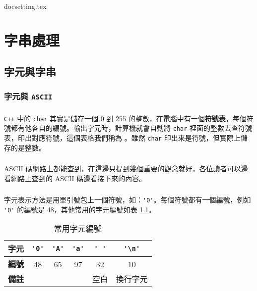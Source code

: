 \documentclass[12pt,a4paper,oneside]{report}
\begin{document}
\begin{CJK}{UTF8}{bkai}

{docsetting.tex}
\setcounter{chapter}{2}

\fi

\chapter{字串處理}

\section{字元與字串}

\subsection{字元與 \texttt{ASCII}}

\paragraph{}\texttt{C++} 中的 \lstinline!char! 其實是儲存一個 0 到 255 的整數，在電腦中有一個\textbf{符號表}，每個符號都有他各自的編號。輸出字元時，計算機就會自動將 \lstinline!char! 裡面的整數去查符號表，印出對應符號，這個表格我們稱為 。雖然 \lstinline!char! 印出來是符號，但實際上儲存的是整數。
\paragraph{}ASCII 碼網路上都能查到，在這邊只提到幾個重要的觀念就好，各位讀者可以邊看網路上查到的 ASCII 碼邊看接下來的內容。
\paragraph{}字元表示方法是用單引號包上一個符號，如：\lstinline!'0'!。每個符號都有一個編號，例如 \lstinline!'0'! 的編號是 48，其他常用的字元編號如表 \ref{string:mani:table:char:ascii}。

\begin{table}[h!]
  \centering
  \begin{tabular}{|c||c|c|c|c|c|}
  \hline
  \textbf{字元} & \lstinline!'0'! & \lstinline!'A'! & \lstinline!'a'! & \lstinline!' '! & \lstinline!'\n'!\\
  \hline
  \textbf{編號} & 48 & 65 & 97 & 32 & 10\\
  \hline
  \textbf{備註} & & & & 空白 & 換行字元\\
  \hline
  \end{tabular}
  \caption{常用字元編號}
  \label{string:mani:table:char:ascii}
\end{table}


\end{CJK}
\end{document}
